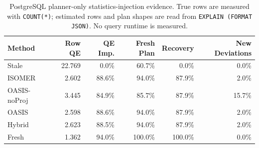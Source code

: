 \begin{table}[t]
  \centering
  \small
  \caption{PostgreSQL planner-only statistics-injection evidence. True rows are measured with \texttt{COUNT(*)}; estimated rows and plan shapes are read from \texttt{EXPLAIN (FORMAT JSON)}. No query runtime is measured.}
  \label{tab:postgres_planner_stats_injection}
  \setlength{\tabcolsep}{4pt}
  \begin{tabular}{lrrrrr}
    \toprule
    Method & Row QE & QE Imp. & Fresh Plan & Recovery & New Deviations \\
    \midrule
    Stale & 22.769 & 0.0\% & 60.7\% & 0.0\% & 0.0\% \\
    ISOMER & 2.602 & 88.6\% & 94.0\% & 87.9\% & 2.0\% \\
    OASIS-noProj & 3.445 & 84.9\% & 85.7\% & 87.9\% & 15.7\% \\
    OASIS & 2.598 & 88.6\% & 94.0\% & 87.9\% & 2.0\% \\
    Hybrid & 2.623 & 88.5\% & 94.0\% & 87.9\% & 2.0\% \\
    Fresh & 1.362 & 94.0\% & 100.0\% & 100.0\% & 0.0\% \\
    \bottomrule
  \end{tabular}
\end{table}

